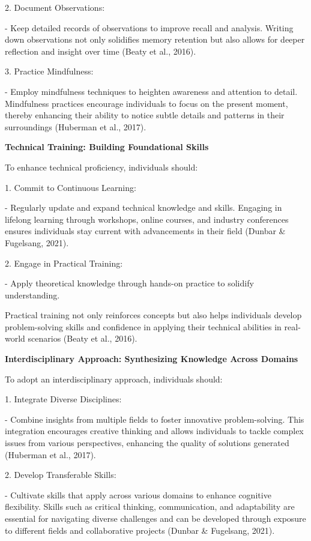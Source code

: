 \documentclass[
]{article}
\begin{document}
2. Document Observations:

- Keep detailed records of observations to improve recall and analysis.
Writing down observations not only solidifies memory retention but also
allows for deeper reflection and insight over time (Beaty et al., 2016).

3. Practice Mindfulness:

- Employ mindfulness techniques to heighten awareness and attention to
detail. Mindfulness practices encourage individuals to focus on the
present moment, thereby enhancing their ability to notice subtle details
and patterns in their surroundings (Huberman et al., 2017).

\textbf{Technical Training: Building Foundational Skills}

To enhance technical proficiency, individuals should:

1. Commit to Continuous Learning:

- Regularly update and expand technical knowledge and skills. Engaging
in lifelong learning through workshops, online courses, and industry
conferences ensures individuals stay current with advancements in their
field (Dunbar \& Fugelsang, 2021).

2. Engage in Practical Training:

- Apply theoretical knowledge through hands-on practice to solidify
understanding.

Practical training not only reinforces concepts but also helps
individuals develop problem-solving skills and confidence in applying
their technical abilities in real-world scenarios (Beaty et al., 2016).

\textbf{Interdisciplinary Approach: Synthesizing Knowledge Across
Domains}

To adopt an interdisciplinary approach, individuals should:

1. Integrate Diverse Disciplines:

- Combine insights from multiple fields to foster innovative
problem-solving. This integration encourages creative thinking and
allows individuals to tackle complex issues from various perspectives,
enhancing the quality of solutions generated (Huberman et al., 2017).

2. Develop Transferable Skills:

- Cultivate skills that apply across various domains to enhance
cognitive flexibility. Skills such as critical thinking, communication,
and adaptability are essential for navigating diverse challenges and can
be developed through exposure to different fields and collaborative
projects (Dunbar \& Fugelsang, 2021).
\end{document}
